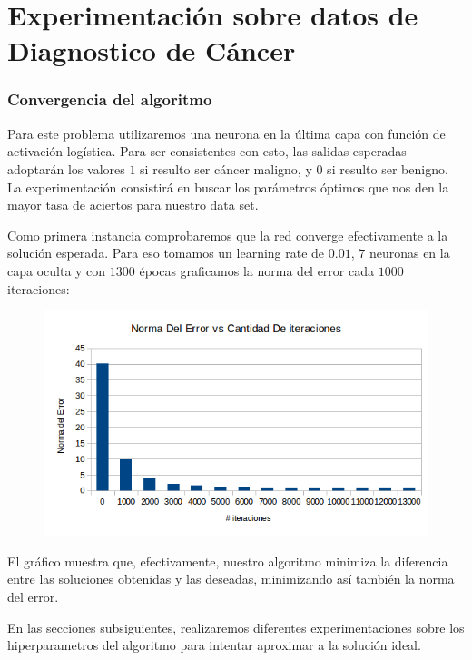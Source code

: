 \section{Experimentación sobre datos de Diagnostico de Cáncer}

\subsubsection{Convergencia del algoritmo} 


Para este problema utilizaremos una neurona en la última capa con función de activación logística. Para ser consistentes con esto, las salidas esperadas adoptarán los valores $1$ si resulto ser cáncer maligno, y $0$ si resulto ser benigno. La experimentación consistirá en buscar los parámetros óptimos que nos den la mayor tasa de aciertos para nuestro data set.

Como primera instancia comprobaremos que la red converge efectivamente a la solución esperada. Para eso tomamos un learning rate de $0.01$, $7$ neuronas en la capa oculta y con $1300$ épocas graficamos la norma del error cada $1000$ iteraciones:

\begin{figure}[h!]
  \centering
    \includegraphics[scale=0.4]{ej1/convergencia.png}
\end{figure}

El gráfico muestra que, efectivamente, nuestro algoritmo minimiza la diferencia entre las soluciones obtenidas y las deseadas, minimizando así también la norma del error.

En las secciones subsiguientes, realizaremos diferentes experimentaciones sobre los hiperparametros del algoritmo para intentar aproximar a la solución ideal.

